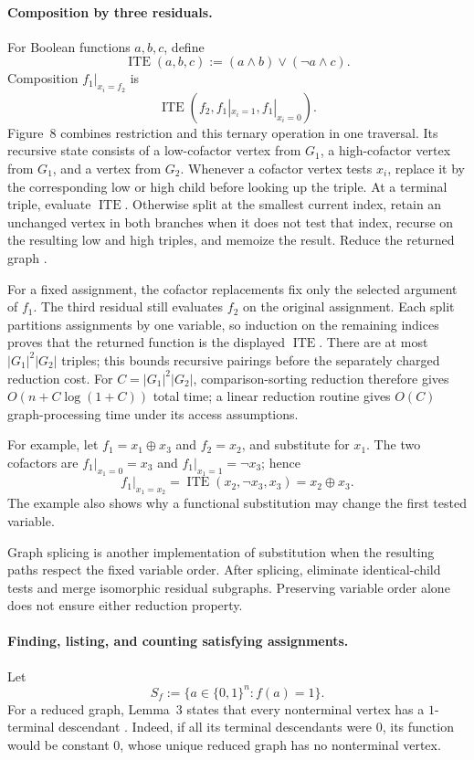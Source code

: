 \paragraph{Composition by three residuals.}
For Boolean functions \(a,b,c\), define
\[
 \operatorname{ITE}(a,b,c):=(a\land b)\lor(\neg a\land c).
\]
Composition \(f_1|_{x_i=f_2}\) is
\[
 \operatorname{ITE}(f_2,f_1|_{x_i=1},f_1|_{x_i=0}).
\]
Figure~8 combines restriction and this ternary operation in one traversal.
Its recursive state consists of a low-cofactor vertex from \(G_1\), a
high-cofactor vertex from \(G_1\), and a vertex from \(G_2\). Whenever a
cofactor vertex tests \(x_i\), replace it by the corresponding low or high
child before looking up the triple. At a terminal triple, evaluate
\(\operatorname{ITE}\). Otherwise split at the smallest current index,
retain an unchanged vertex in both branches when it does not test that index,
recurse on the resulting low and high triples, and memoize the result.
Reduce the returned graph \cite[\S4.5 and fig.~8]{Bryant1986}.

For a fixed assignment, the cofactor replacements fix only the selected
argument of \(f_1\). The third residual still evaluates \(f_2\) on the original
assignment. Each split partitions assignments by one variable, so induction
on the remaining indices proves that the returned function is the displayed
\(\operatorname{ITE}\). There are at most
\(|G_1|^2|G_2|\) triples; this bounds recursive pairings before the separately
charged reduction cost. For \(C=|G_1|^2|G_2|\), comparison-sorting reduction
therefore gives \(O(n+C\log(1+C))\) total time; a linear reduction routine
gives \(O(C)\) graph-processing time under its access assumptions.

For example, let \(f_1=x_1\mathbin{\oplus}x_3\) and
\(f_2=x_2\), and substitute for \(x_1\). The two cofactors are
\(f_1|_{x_1=0}=x_3\) and \(f_1|_{x_1=1}=\neg x_3\); hence
\[
 f_1|_{x_1=x_2}
   =\operatorname{ITE}(x_2,\neg x_3,x_3)
   =x_2\mathbin{\oplus}x_3.
\]
The example also shows why a functional substitution may change the first
tested variable.

Graph splicing is another implementation of substitution when the resulting
paths respect the fixed variable order. After splicing, eliminate
identical-child tests and merge isomorphic residual subgraphs. Preserving
variable order alone does not ensure either reduction property.

\paragraph{Finding, listing, and counting satisfying assignments.}
Let
\[
 S_f:=\{a\in\{0,1\}^n:f(a)=1\}.
\]
For a reduced graph, Lemma~3 states that every nonterminal vertex has a
\(1\)-terminal descendant \cite[\S4.6]{Bryant1986}. Indeed, if all its
terminal descendants were \(0\), its function would be constant \(0\), whose
unique reduced graph has no nonterminal vertex.

